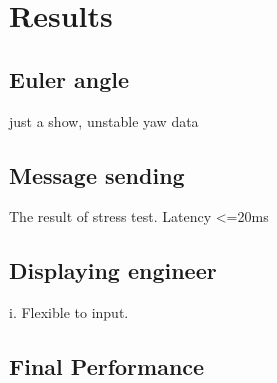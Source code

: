 \chapter{Results}

\section{Euler angle}
	just a show, unstable yaw data

\section{Message sending}
	The result of stress test. Latency <=20ms

\section{Displaying engineer}
i.	Flexible to input.

\section{Final Performance}

